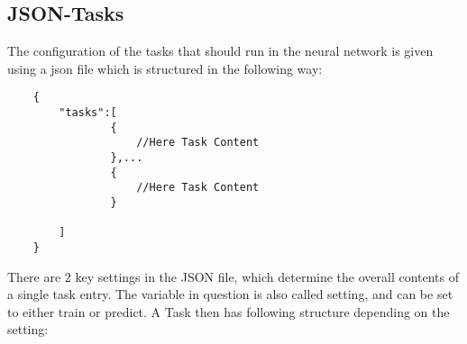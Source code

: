 \documentclass{article}
\begin{document}
\subsection{JSON-Tasks}
The configuration of the tasks that should run in the neural network is given using a json file which is structured in the following way:
\begin{verbatim}
    {
        "tasks":[
                {
                    //Here Task Content    
                },...
                {
                    //Here Task Content 
                }
        
        ]
    }
\end{verbatim}
There are 2 key settings in the JSON file, which determine the overall contents of a single task entry. The variable in question is also called setting, and can be set to either train or predict. A Task then has following structure depending on the setting:
\end{document}
